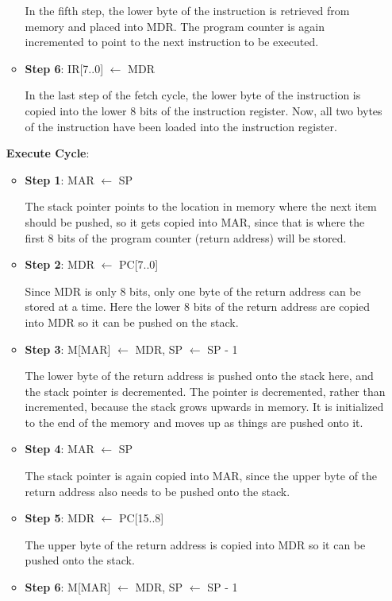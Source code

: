 \documentclass[11pt]{article}
\begin{document}
\begin{enumerate}[leftmargin=0.2in]
\begin{itemize}
    In the fifth step, the lower byte of the instruction is retrieved from memory and placed into MDR. The program counter is again incremented to point to the next instruction to be executed.

  \item \textbf{Step 6}: IR[7..0] $\leftarrow$ MDR

    In the last step of the fetch cycle, the lower byte of the instruction is copied into the lower 8 bits of the instruction register. Now, all two bytes of the instruction have been loaded into the instruction register.
\end{itemize}

\textbf{Execute Cycle}:
\begin{itemize}
  \item \textbf{Step 1}: MAR $\leftarrow$ SP

    The stack pointer points to the location in memory where the next item should be pushed, so it gets copied into MAR, since that is where the first 8 bits of the program counter (return address) will be stored.

  \item \textbf{Step 2}: MDR $\leftarrow$ PC[7..0]

    Since MDR is only 8 bits, only one byte of the return address can be stored at a time. Here the lower 8 bits of the return address are copied into MDR so it can be pushed on the stack.

  \item \textbf{Step 3}: M[MAR] $\leftarrow$ MDR, SP $\leftarrow$ SP - 1

    The lower byte of the return address is pushed onto the stack here, and the stack pointer is decremented. The pointer is decremented, rather than incremented, because the stack grows upwards in memory. It is initialized to the end of the memory and moves up as things are pushed onto it.

  \item \textbf{Step 4}: MAR $\leftarrow$ SP

    The stack pointer is again copied into MAR, since the upper byte of the return address also needs to be pushed onto the stack.

  \item \textbf{Step 5}: MDR $\leftarrow$ PC[15..8]

    The upper byte of the return address is copied into MDR so it can be pushed onto the stack.

  \item \textbf{Step 6}: M[MAR] $\leftarrow$ MDR, SP $\leftarrow$ SP - 1


\end{itemize}
\end{enumerate}
\end{document}
